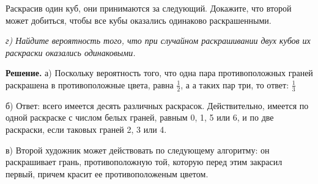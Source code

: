 {\begin{multicols}{3}
{Раскрасив один куб, они принимаются за следующий. Докажите,
что второй может добиться, чтобы все кубы оказались одинаково
раскрашенными.} \par
\textsl{г) Найдите вероятность того, что при случайном раскрашивании двух
кубов их раскраски оказались одинаковыми.} \par
\textbf{Решение.}  а) Поскольку вероятность того, что одна пара
противоположных граней раскрашена в противоположные цвета, равна
$\frac{1}{2}$, а а таких пар три, то ответ: $\frac{1}{3}$ \par
б) Ответ: всего имеется десять различных раскрасок. Действительно,
имеется по одной раскраске с числом белых граней, равным 0, 1, 5 или 6, и
по две раскраски, если таковых граней 2, 3 или 4. \par
в) Второй художник может действовать по следующему алгоритму:
он раскрашивает грань, противоположную той, которую перед этим
закрасил первый, причем красит ее противоположеным цветом.
\end{multicols}}